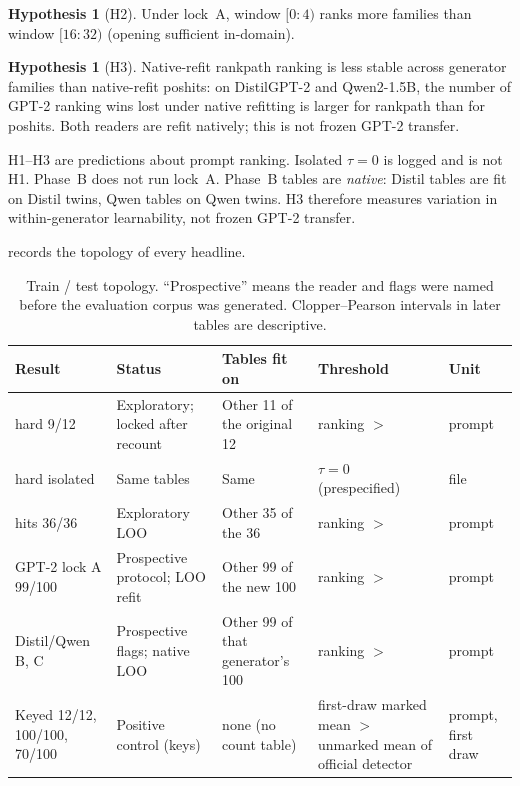 \documentclass[11pt,a4paper]{article}
\theoremstyle{definition}
\newtheorem{hypothesis}[definition]{Hypothesis}
\begin{document}
\begin{hypothesis}[H2]
\label{hyp:h2}
Under lock~A, window $[0{:}4)$ ranks more families than window
$[16{:}32)$ (opening sufficient in-domain).
\end{hypothesis}

\begin{hypothesis}[H3]
\label{hyp:h3}
Native-refit rankpath ranking is less stable across generator families
than native-refit poshits: on DistilGPT-2 and Qwen2-1.5B, the number of
GPT-2 ranking wins lost under native refitting is larger for rankpath
than for poshits. Both readers are refit natively; this is not frozen
GPT-2 transfer.
\end{hypothesis}

H1--H3 are predictions about prompt ranking. Isolated $\tau=0$ is
logged and is not H1. Phase~B does not run lock~A. Phase~B tables are
\emph{native}: Distil tables are fit on Distil twins, Qwen tables on
Qwen twins. H3 therefore measures variation in within-generator
learnability, not frozen GPT-2 transfer.

 records the topology of every headline.

\begin{table}[t]
\centering
\footnotesize
\caption{Train / test topology. ``Prospective'' means the reader and
flags were named before the evaluation corpus was generated. Clopper--Pearson
intervals in later tables are descriptive.}
\label{tab:protocol}
\begin{tabularx}{\textwidth}{@{}>{\raggedright\arraybackslash}p{2.4cm} >{\raggedright\arraybackslash}p{2.6cm} >{\raggedright\arraybackslash}p{3.0cm} >{\raggedright\arraybackslash}X >{\raggedright\arraybackslash}p{1.6cm}@{}}
\toprule
Result & Status & Tables fit on & Threshold & Unit \\
\midrule
12 hard 9/12 & Exploratory; locked after recount & Other 11 of the original 12 & ranking $>$ & prompt \\
12 hard isolated & Same tables & Same & $\tau=0$ (prespecified) & file \\
36 hits 36/36 & Exploratory LOO & Other 35 of the 36 & ranking $>$ & prompt \\
GPT-2 lock A 99/100 & Prospective protocol; LOO refit & Other 99 of the new 100 & ranking $>$ & prompt \\
Distil/Qwen B, C & Prospective flags; native LOO & Other 99 of that generator's 100 & ranking $>$ & prompt \\
Keyed 12/12, 100/100, 70/100 & Positive control (keys) & none (no count table) & first-draw marked mean $>$ unmarked mean of official detector & prompt, first draw \\
\bottomrule
\end{tabularx}
\end{table}
\end{document}
